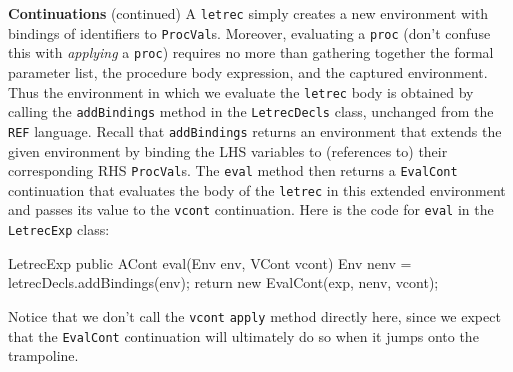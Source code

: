 \begin{minipage}[t]{\sw}
\slidenumber
\LARGE
{\bf Continuations} (continued)\exx
A \verb'letrec' simply creates a new environment
with bindings of identifiers to \verb'ProcVal's.
Moreover, evaluating a \verb'proc'
(don't confuse this with {\em applying} a \verb'proc')
requires no more than gathering together
the formal parameter list, the procedure body expression,
and the captured environment.
Thus the environment in which we evaluate the \verb'letrec' body
is obtained by calling the \verb'addBindings' method
in the \verb'LetrecDecls' class,
unchanged from the \verb'REF' language.
Recall that \verb'addBindings' returns an environment
that extends the given environment
by binding the LHS variables
to (references to) their corresponding RHS \verb'ProcVal's.
The \verb'eval' method then returns a \verb'EvalCont' continuation
that evaluates the body of the \verb'letrec'
in this extended environment
and passes its value to the \verb'vcont' continuation.
Here is the code for \verb'eval' in the \verb'LetrecExp' class:
\Large
\begin{qv}
LetrecExp
    public ACont eval(Env env, VCont vcont) {
        Env nenv = letrecDecls.addBindings(env);
        return new EvalCont(exp, nenv, vcont);
    }
\end{qv}
\LARGE
Notice that we don't call the \verb'vcont' \verb'apply' method directly here,
since we expect that the \verb'EvalCont' continuation will ultimately do so
when it jumps onto the trampoline.
\end{minipage}
